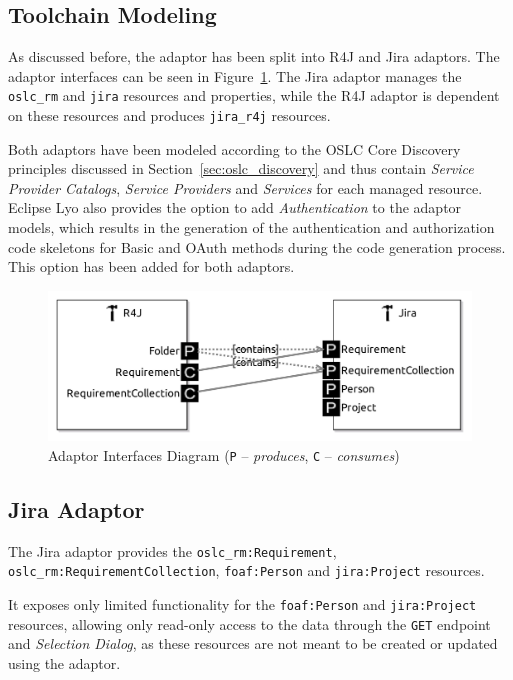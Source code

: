 \subsection{Toolchain Modeling}
As discussed before, the adaptor has been split into R4J and Jira adaptors. The adaptor interfaces can be seen in Figure \ref{fig:adaptor_interfaces_diagram}. The Jira adaptor manages the \texttt{oslc\_rm} and \texttt{jira} resources and properties, while the R4J adaptor is dependent on these resources and produces \texttt{jira\_r4j} resources.

Both adaptors have been modeled according to the OSLC Core Discovery principles discussed in Section \ref{sec:oslc_discovery} and thus contain \emph{Service Provider Catalogs}, \emph{Service Providers} and \emph{Services} for each managed resource. Eclipse Lyo also provides the option to add \emph{Authentication} to the adaptor models, which results in the generation of the authentication and authorization code skeletons for Basic and OAuth methods during the code generation process. This option has been added for both adaptors.

\begin{figure}[h]
  \centering
  \includegraphics[width= .8\linewidth]{figures/adaptors_interface.jpg}
  \caption{Adaptor Interfaces Diagram (\texttt{P} -- \emph{produces}, \texttt{C} -- \emph{consumes})}
  \label{fig:adaptor_interfaces_diagram}
\end{figure}

\subsection*{Jira Adaptor}
The Jira adaptor provides the \texttt{oslc\_rm:Requirement}, \texttt{oslc\_rm:RequirementCollection}, \texttt{foaf:Person} and \texttt{jira:Project} resources.

It exposes only limited functionality for the \texttt{foaf:Person} and \texttt{jira:Project} resources, allowing only read-only access to the data through the \texttt{GET} endpoint and \emph{Selection Dialog}, as these resources are not meant to be created or updated using the adaptor.

